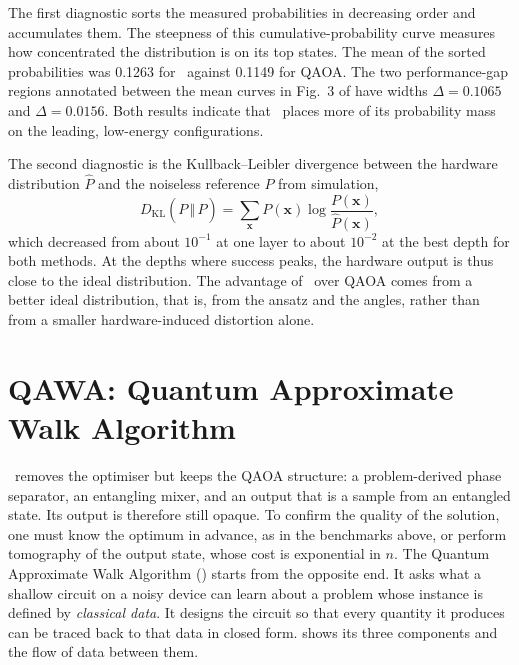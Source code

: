 The first diagnostic sorts the measured probabilities in decreasing order and accumulates them. The steepness of this cumulative-probability curve measures how concentrated the distribution is on its top states. The mean of the sorted probabilities was 0.1263 for \deal\ against 0.1149 for QAOA. The two performance-gap regions annotated between the mean curves in Fig.~3 of \cite{guo2025deal} have widths $\Delta=0.1065$ and $\Delta=0.0156$. Both results indicate that \deal\ places more of its probability mass on the leading, low-energy configurations.

The second diagnostic is the Kullback--Leibler divergence between the hardware distribution $\hat{P}$ and the noiseless reference $P$ from simulation,
\begin{equation}\label{eq:nisq:kl}
  D_{\mathrm{KL}}(P\,\Vert\,\hat{P}) = \sum_{\bm{x}} P(\bm{x})\log\frac{P(\bm{x})}{\hat{P}(\bm{x})},
\end{equation}
which decreased from about $10^{-1}$ at one layer to about $10^{-2}$ at the best depth for both methods. At the depths where success peaks, the hardware output is thus close to the ideal distribution. The advantage of \deal\ over QAOA comes from a better ideal distribution, that is, from the ansatz and the angles, rather than from a smaller hardware-induced distortion alone.

\section{QAWA: Quantum Approximate Walk Algorithm}\label{sec:nisq:qawa}

\deal\ removes the optimiser but keeps the QAOA structure: a problem-derived phase separator, an entangling mixer, and an output that is a sample from an entangled state. Its output is therefore still opaque. To confirm the quality of the solution, one must know the optimum in advance, as in the benchmarks above, or perform tomography of the output state, whose cost is exponential in $n$. The Quantum Approximate Walk Algorithm (\qawa) \cite{guo2025qawa} starts from the opposite end. It asks what a shallow circuit on a noisy device can learn about a problem whose instance is defined by \emph{classical data}. It designs the circuit so that every quantity it produces can be traced back to that data in closed form.  shows its three components and the flow of data between them.

